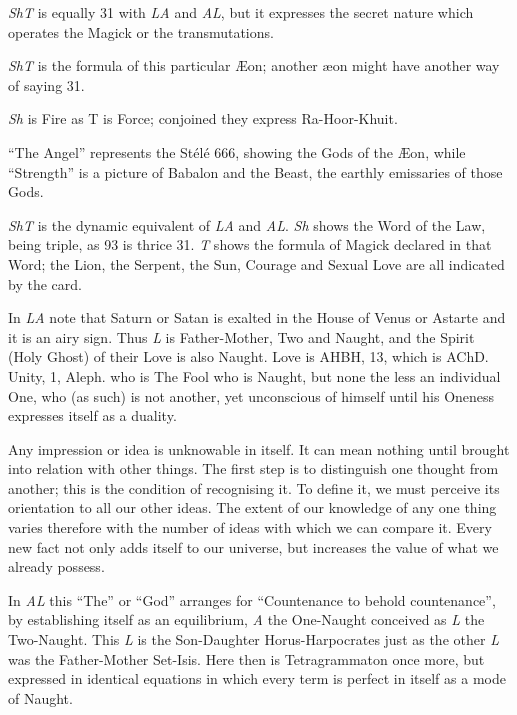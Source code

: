 \textit{ShT} is equally 31 with \textit{LA} and \textit{AL}, but it expresses the secret nature which operates the Magick or the transmutations.

\textit{ShT} is the formula of this particular \AE{}on; another \ae{}on might have another way of saying 31.

\textit{Sh} is Fire as T is Force; conjoined they express Ra-Hoor-Khuit.

\enquote{The Angel} represents the St\'{e}l\'{e} 666, showing the Gods of the \AE{}on, while \enquote{Strength} is a picture of Babalon and the Beast, the earthly emissaries of those Gods.

\textit{ShT} is the dynamic equivalent of \textit{LA} and \textit{AL}. \textit{Sh} shows the Word of the Law, being triple, as 93 is thrice 31. \textit{T} shows the formula of Magick declared in that Word; the Lion, the Serpent, the Sun, Courage and Sexual Love are all indicated by the card.

In \textit{LA} note that Saturn or Satan is exalted in the House of Venus or Astarte and it is an airy sign. Thus \textit{L} is Father-Mother, Two and Naught, and the Spirit (Holy Ghost) of their Love is also Naught. Love is AHBH, 13, which is AChD. Unity, 1, Aleph. who is The Fool who is Naught, but none the less an individual One, who (as such) is not another, yet unconscious of himself until his Oneness expresses itself as a duality.

Any impression or idea is unknowable in itself. It can mean nothing until brought into relation with other things. The first step is to distinguish one thought from another; this is the condition of recognising it. To define it, we must perceive its orientation to all our other ideas. The extent of our knowledge of any one thing varies therefore with the number of ideas with which we can compare it. Every new fact not only adds itself to our universe, but increases the value of what we already possess.

In \textit{AL} this \enquote{The} or \enquote{God} arranges for \enquote{Countenance to behold countenance}, by establishing itself as an equilibrium, \textit{A} the One-Naught conceived as \textit{L} the Two-Naught. This \textit{L} is the Son-Daughter Horus-Harpocrates just as the other \textit{L} was the Father-Mother Set-Isis. Here then is Tetragrammaton once more, but expressed in identical equations in which every term is perfect in itself as a mode of Naught.

